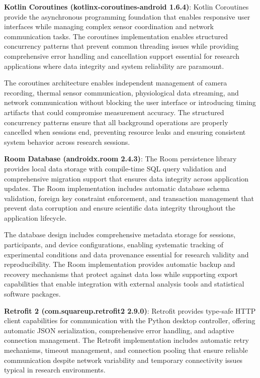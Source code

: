 \documentclass[11pt,a4paper]{report}
\begin{document}
\textbf{Kotlin Coroutines (kotlinx-coroutines-android 1.6.4)}: Kotlin Coroutines provide the asynchronous programming
foundation that enables responsive user interfaces while managing complex sensor coordination and network communication
tasks. The coroutines implementation enables structured concurrency patterns that prevent common threading issues while
providing comprehensive error handling and cancellation support essential for research applications where data integrity
and system reliability are paramount.

The coroutines architecture enables independent management of camera recording, thermal sensor communication,
physiological data streaming, and network communication without blocking the user interface or introducing timing
artifacts that could compromise measurement accuracy. The structured concurrency patterns ensure that all background
operations are properly cancelled when sessions end, preventing resource leaks and ensuring consistent system behavior
across research sessions.

\textbf{Room Database (androidx.room 2.4.3)}: The Room persistence library provides local data storage with compile-time SQL
query validation and comprehensive migration support that ensures data integrity across application updates. The Room
implementation includes automatic database schema validation, foreign key constraint enforcement, and transaction
management that prevent data corruption and ensure scientific data integrity throughout the application lifecycle.

The database design includes comprehensive metadata storage for sessions, participants, and device configurations,
enabling systematic tracking of experimental conditions and data provenance essential for research validity and
reproducibility. The Room implementation provides automatic backup and recovery mechanisms that protect against data
loss while supporting export capabilities that enable integration with external analysis tools and statistical software
packages.

\textbf{Retrofit 2 (com.squareup.retrofit2 2.9.0)}: Retrofit provides type-safe HTTP client capabilities for communication
with the Python desktop controller, offering automatic JSON serialization, comprehensive error handling, and adaptive
connection management. The Retrofit implementation includes automatic retry mechanisms, timeout management, and
connection pooling that ensure reliable communication despite network variability and temporary connectivity issues
typical in research environments.
\end{document}
